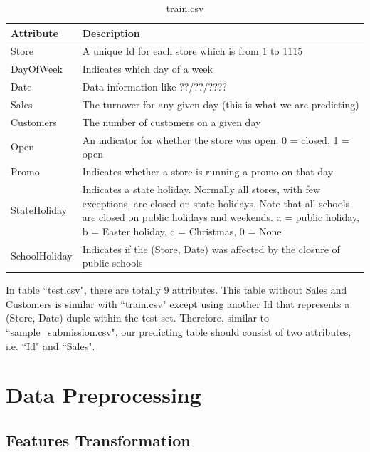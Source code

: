 \documentclass[11pt]{article}
\begin{document}
\newpage
\begin{table}[ht!]
	\begin{center}
		\begin{tabular}{|l|p{8cm}|}
			\hline
			Attribute & Description \\
			\hline
			Store & A unique Id for each store which is from $1$ to $1115$ \\
			\hline
			DayOfWeek & Indicates which day of a week\\
			\hline
			Date & Data information like ??/??/????\\
			\hline
			Sales & The turnover for any given day (this is what we are predicting)\\
			\hline
			Customers & The number of customers on a given day\\
			\hline
			Open & An indicator for whether the store was open: 0 = closed, 1 = open\\
			\hline 
			Promo & Indicates whether a store is running a promo on that day\\
			\hline
			StateHoliday  & Indicates a state holiday. Normally all stores, with few exceptions, are closed on state holidays. Note that all schools are closed on public holidays and weekends. a = public holiday, b = Easter holiday, c = Christmas, 0 = None\\
			\hline
			SchoolHoliday & Indicates if the (Store, Date) was affected by the closure of public schools\\
			\hline  
		\end{tabular}
	\end{center}
	\caption{train.csv}
	\label{table2}
\end{table}%

In table ``test.csv", there are totally $9$ attributes. This table without Sales and Customers is similar with ``train.csv" except using another Id that represents a (Store, Date) duple within the test set. Therefore, similar to ``sample\_submission.csv", our predicting table should consist of two attributes, i.e. ``Id" and ``Sales". 


\section{Data Preprocessing}

\subsection{Features Transformation}
\end{document}
